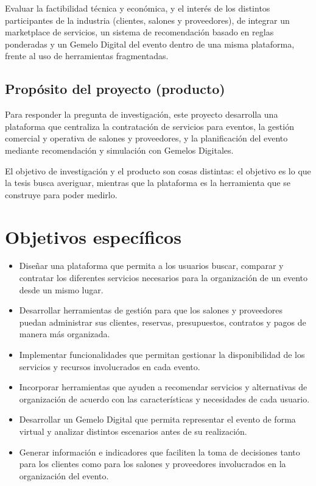 Evaluar la factibilidad técnica y económica, y el interés de los
distintos participantes de la industria (clientes, salones y
proveedores), de integrar un marketplace de servicios, un sistema de
recomendación basado en reglas ponderadas y un Gemelo Digital del
evento dentro de una misma plataforma, frente al uso de herramientas
fragmentadas.

\subsection{Propósito del proyecto (producto)}

Para responder la pregunta de investigación, este proyecto desarrolla una
plataforma que centraliza la contratación de servicios para
eventos, la gestión comercial y operativa de salones y proveedores, y la
planificación del evento mediante recomendación y simulación con Gemelos
Digitales.

El objetivo de investigación y el producto son cosas distintas: el
objetivo es lo que la tesis busca averiguar, mientras que la plataforma
es la herramienta que se construye para poder medirlo.

\section{Objetivos específicos}

\begin{itemize}
    \item Diseñar una plataforma que permita a los usuarios buscar,
          comparar y contratar los diferentes servicios necesarios para la
          organización de un evento desde un mismo lugar.
    \item Desarrollar herramientas de gestión para que los salones y
          proveedores puedan administrar sus clientes, reservas,
          presupuestos, contratos y pagos de manera más organizada.
    \item Implementar funcionalidades que permitan gestionar la
          disponibilidad de los servicios y recursos involucrados en cada
          evento.
    \item Incorporar herramientas que ayuden a recomendar
          servicios y alternativas de organización de acuerdo con las
          características y necesidades de cada usuario.
    \item Desarrollar un Gemelo Digital que permita representar el evento
          de forma virtual y analizar distintos escenarios antes de su
          realización.
    \item Generar información e indicadores que faciliten la toma de
          decisiones tanto para los clientes como para los salones y
          proveedores involucrados en la organización del evento.
\end{itemize}

